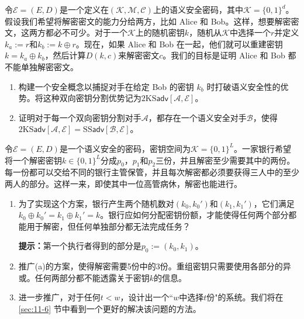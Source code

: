 \begin{exercise}[双向分割密钥]
令$\mathcal{E}=(E,D)$是一个定义在$(\mathcal{K},\mathcal{M},\mathcal{C})$上的语义安全密码，其中$\mathcal{K}=\{0,1\}^d$。假设我们希望将解密密文的能力分给两方，比如 Alice 和 Bob。这样，想要解密密文，这两方都必不可少。对于一个$\mathcal{K}$上的随机密钥$k$，随机从$\mathcal{K}$中选择一个$r$并定义$k_a:=r$和$k_b:=k\oplus r$。现在，如果 Alice 和 Bob 在一起，他们就可以重建密钥$k=k_a\oplus k_b$，然后计算$D(k,c)$来解密密文$c$。我们的目标是证明 Alice 和 Bob 都不能单独解密密文。
\begin{enumerate}[\indent(a)]
	\item 构建一个安全概念以捕捉对手在给定 Bob 的密钥 $k_b$ 时打破语义安全性的优势。将这种双向密钥分割优势记为$\mathrm{2KS}\mathsf{adv}[\mathcal{A},\mathcal{E}]$。
	\item 证明对于每一个双向密钥分割对手$\mathcal{A}$，都存在一个语义安全对手$\mathcal{B}$，使得$\mathrm{2KS}\mathsf{adv}[\mathcal{A},\mathcal{E}]=\mathrm{SS}\mathsf{adv}[\mathcal{B},\mathcal{E}]$。
\end{enumerate}
\end{exercise}

\begin{exercise}[简单的秘密共享]\label{exer:2-20}
令$\mathcal{E}=(E,D)$是一个语义安全的密码，密钥空间为$\mathcal{K}=\{0,1\}^L$。一家银行希望将一个解密密钥$k\in\{0,1\}^L$分成$p_0$，$p_1$和$p_2$三份，并且解密至少需要其中的两份。每一份都可以交给不同的银行主管保管，并且每次解密都必须要获得三人中的至少两人的部分。这样一来，即使其中一位高管病休，解密也能进行。
\begin{enumerate}[\indent(a)]
	\item 为了实现这个方案，银行产生两个随机数对$(k_0,k_0')$和$(k_1,k_1')$，它们满足$k_0\oplus k_0'=k_1\oplus k_1'=k$。银行应如何分配密钥份额，才能使得任何两个部分都能用于解密，但任何单独部分都无法完成任务？

	\vspace{1pt}

	\textbf{提示：}第一个执行者得到的部分是$p_0:=(k_0,k_1)$。
	\item 推广(a)的方案，使得解密需要5份中的3份。重组密钥只需要使用各部分的异或。任何两部分都不能透露关于密钥$k$的信息。
	\item 进一步推广，对于任何$t<w$，设计出一个``$w$中选择$t$份"的系统。我们将在 \ref{sec:11-6} 节中看到一个更好的解决该问题的方法。
\end{enumerate}
\end{exercise}

